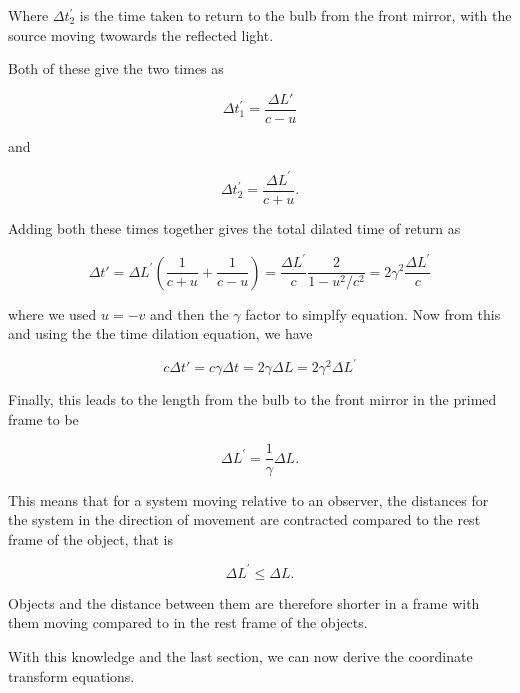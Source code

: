 Where ${\Delta t^{'}_2}$ is the time taken to return to the bulb from the front mirror, with the source moving twowards the reflected light.

Both of these give the two times as

\begin{equation}
	{\Delta t^{'}_1} = \frac{\Delta  L'}{{c} - {u}}
\end{equation}

and

\begin{equation}
	{\Delta t^{'}_2} = \frac{{\Delta  L^{'}}}{{c} + {u}}.
\end{equation}

Adding both these times together gives the total dilated time of return as

\begin{equation}
	{\Delta t{'}} = {\Delta  L^{'}}(\frac{1}{{c} + {u}} + \frac{1}{{c} - {u}}) = \frac{\Delta  L^{'}}{c}\frac{2}{1- {u}^2/{c}^2} =  2{\gamma}^2 \frac{\Delta  L^{'}}{c}
\end{equation}

where we used ${u}=-{v}$ and then the ${\gamma}$ factor to simplfy equation.
Now from this and using the the time dilation equation, we have

\begin{equation}
	{c}{\Delta t{'}} = {c}{\gamma} {\Delta t} = 2{\gamma} {\Delta L} = 2{\gamma}^2 {\Delta  L^{'}}
\end{equation}

Finally, this leads to the length from the bulb to the front mirror in the primed frame to be

\begin{equation}
	{\Delta  L^{'}} = \frac{1}{{\gamma}}{\Delta  L}.
\end{equation}

This means that for a system moving relative to an observer, the distances for the system in the direction of movement are contracted compared to the rest frame of the object, that is

\begin{equation}
	{\Delta  L^{'}} \leq {\Delta  L}.
\end{equation}

Objects and the distance between them are therefore shorter in a frame with them moving compared to in the rest frame of the objects.

With this knowledge and the last section, we can now derive the coordinate transform equations.

